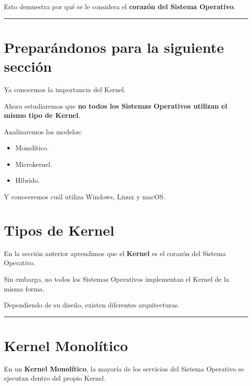\documentclass[
  spanish,
  letterpaper,
]{scrbook}
\providecommand{\tightlist}{%
  \setlength{\itemsep}{0pt}\setlength{\parskip}{0pt}}
\begin{document}
Esto demuestra por qué se le considera el \textbf{corazón del Sistema
Operativo}.

\begin{center}\rule{0.5\linewidth}{0.5pt}\end{center}


\chapter{Preparándonos para la siguiente
sección}\label{preparuxe1ndonos-para-la-siguiente-secciuxf3n-2}

Ya conocemos la importancia del Kernel.

Ahora estudiaremos que \textbf{no todos los Sistemas Operativos utilizan
el mismo tipo de Kernel}.

Analizaremos los modelos:

\begin{itemize}
\tightlist
\item
  Monolítico.
\item
  Microkernel.
\item
  Híbrido.
\end{itemize}

Y conoceremos cuál utiliza Windows, Linux y macOS.


\chapter{Tipos de Kernel}\label{tipos-de-kernel}

En la sección anterior aprendimos que el \textbf{Kernel} es el corazón
del Sistema Operativo.

Sin embargo, no todos los Sistemas Operativos implementan el Kernel de
la misma forma.

Dependiendo de su diseño, existen diferentes arquitecturas.

\begin{center}\rule{0.5\linewidth}{0.5pt}\end{center}


\chapter{Kernel Monolítico}\label{kernel-monoluxedtico}

En un \textbf{Kernel Monolítico}, la mayoría de los servicios del
Sistema Operativo se ejecutan dentro del propio Kernel.
\end{document}
